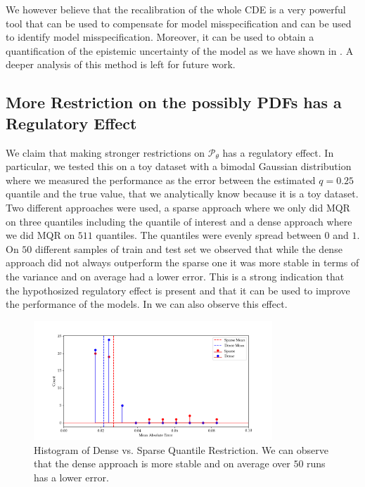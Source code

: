 We however believe that the recalibration of the whole CDE is a very powerful tool that can be used to compensate for model misspecification and can be used to identify model misspecification. Moreover, it can be used to obtain a quantification of the epistemic uncertainty of the model as we have shown in . A deeper analysis of this method is left for future work.

\subsection{More Restriction on the possibly PDFs has a Regulatory Effect}\label{sec:experiment_results_more_restriction}

We claim that making stronger restrictions on $\mathscr{P}_\theta$ has a regulatory effect. In particular, we tested this on a toy dataset with a bimodal Gaussian distribution where we measured the performance as the error between the estimated $q = 0.25$ quantile and the true value, that we analytically know because it is a toy dataset. Two different approaches were used, a sparse approach where we only did MQR on three quantiles including the quantile of interest and a dense approach where we did MQR on $511$ quantiles. The quantiles were evenly spread between $0$ and $1$. On $50$ different samples of train and test set we observed that while the dense approach did not always outperform the sparse one it was more stable in terms of the variance and on average had a lower error. This is a strong indication that the hypothosized regulatory effect is present and that it can be used to improve the performance of the models. In  we can also observe this effect.

\begin{figure}
    \centering
    \includegraphics[width=0.8\textwidth]{resources/mean_absolute_error.png}
    \caption[Histogram of Dense vs. Sparse Quantile Restriction]{Histogram of Dense vs. Sparse Quantile Restriction. We can observe that the dense approach is more stable and on average over $50$ runs has a lower error.}\label{fig:toy_dense_sparse}
\end{figure}

